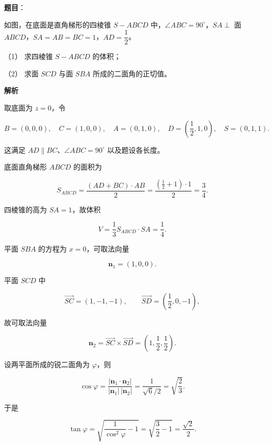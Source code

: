 \begin{answer}

\textbf{题目}：

如图，在底面是直角梯形的四棱锥 $S-ABCD$ 中，$\angle ABC=90^\circ$，$SA\perp$ 面 $ABCD$，$SA=AB=BC=1$，$AD=\dfrac12$。
\nopagebreak[4]
\begin{center}\end{center}
\nopagebreak[4]
（1） 求四棱锥 $S-ABCD$ 的体积；

（2） 求面 $SCD$ 与面 $SBA$ 所成的二面角的正切值。

\textbf{解析}

取底面为 $z=0$，令

\nopagebreak[4]
\[
B=(0,0,0),\quad C=(1,0,0),\quad A=(0,1,0),\quad
D=\left(\frac12,1,0\right),\quad S=(0,1,1).
\]

这满足 $AD\parallel BC$、$\angle ABC=90^\circ$ 以及题设各长度。


底面直角梯形 $ABCD$ 的面积为

\nopagebreak[4]
\[
S_{ABCD}=\frac{(AD+BC)\cdot AB}{2}
=\frac{\left(\frac12+1\right)\cdot1}{2}=\frac34.
\]

四棱锥的高为 $SA=1$，故体积

\nopagebreak[4]
\[
V=\frac13S_{ABCD}\cdot SA=\frac14.
\]


平面 $SBA$ 的方程为 $x=0$，可取法向量

\nopagebreak[4]
\[
\boldsymbol n_1=(1,0,0).
\]

平面 $SCD$ 中

\nopagebreak[4]
\[
\overrightarrow{SC}=(1,-1,-1),\qquad
\overrightarrow{SD}=\left(\frac12,0,-1\right),
\]

故可取法向量

\nopagebreak[4]
\[
\boldsymbol n_2=\overrightarrow{SC}\times\overrightarrow{SD}
=\left(1,\frac12,\frac12\right).
\]

设两平面所成的锐二面角为 $\varphi$，则

\nopagebreak[4]
\[
\cos\varphi=\frac{|\boldsymbol n_1\cdot\boldsymbol n_2|}
{|\boldsymbol n_1|\,|\boldsymbol n_2|}
=\frac1{\sqrt6/2}=\sqrt{\frac23}.
\]

于是

\nopagebreak[4]
\[
\tan\varphi=\sqrt{\frac1{\cos^2\varphi}-1}
=\sqrt{\frac32-1}=\frac{\sqrt2}{2}.
\]



\end{answer}
